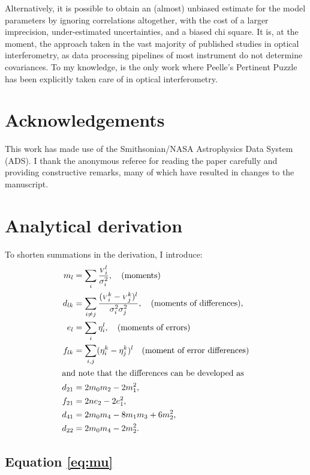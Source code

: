 \documentclass{pasa}
\begin{document}
Alternatively, it is possible to obtain an (almost) unbiased estimate for the model parameters by ignoring correlations altogether, with the cost of a larger imprecision, under-estimated uncertainties, and a biased chi square. It is, at the moment, the approach taken in the vast majority of published studies in optical interferometry, as data processing pipelines of most instrument do not determine covariances. To my knowledge, \citet{LAC19} is the only work where Peelle's Pertinent Puzzle has been explicitly taken care of in optical interferometry.

\section*{Acknowledgements}
This work has made use of the Smithsonian/NASA Astrophysics Data System (ADS).  I thank the anonymous referee for reading the paper carefully and providing constructive remarks, many of which have resulted in changes to the manuscript. 

\appendix

\section{Analytical derivation}

To shorten summations in the derivation, I introduce:
\begin{align*}
    m_l    &= \sum_i \frac{{\scriptstyle V}_i^l}{\sigma_i^2}, \quad\text{(moments)}\\
    d_{lk} &= \sum_{i \ne j} \frac{({\scriptstyle V}_i^k-{\scriptstyle V}_j^k)^l}{\sigma_i^2\sigma_j^2}, \quad\text{(moments of differences)},\\
    e_l    &= \sum_i \eta_i^l, \quad\text{(moments of errors)}\\
    f_{lk} &= \sum_{i, j} (\eta_i^k - \eta_j^k)^l \quad\text{(moment of error differences)}\\
\intertext{and note that the differences can be developed as}
    d_{21} &= 2m_0m_2 - 2m_1^2,\\
    f_{21} &= 2n e_2 -  2e_1^2,\\
    d_{41} &= 2m_0m_4 - 8m_1m_3 + 6m_2^2,\\
    d_{22} &= 2m_0m_4 - 2m_2^2.
\end{align*}


\subsection{Equation \ref{eq:mu}}
\label{ap:mu}
\end{document}
